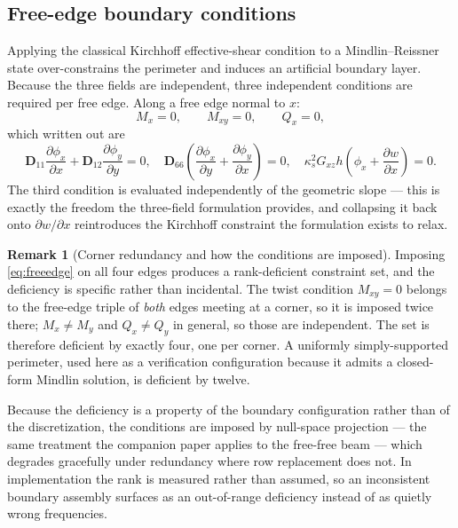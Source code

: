 \documentclass[11pt,a4paper]{article}
\theoremstyle{definition}
\newtheorem{remark}[theorem]{Remark}
\numberwithin{equation}{section}
\begin{document}
\subsection{Free-edge boundary conditions}
\label{sec:bc}

Applying the classical Kirchhoff effective-shear condition to a Mindlin--Reissner state over-constrains the perimeter and induces an artificial boundary layer. Because the three fields are independent, three independent conditions are required per free edge. Along a free edge normal to $x$:
\begin{equation}
\label{eq:freeedge}
M_x = 0, \qquad M_{xy} = 0, \qquad Q_x = 0,
\end{equation}
which written out are
\begin{equation}
\label{eq:freeedge_exp}
\mathbf{D}_{11} \frac{\partial \phi_x}{\partial x} + \mathbf{D}_{12} \frac{\partial \phi_y}{\partial y} = 0,
\quad
\mathbf{D}_{66}\left( \frac{\partial \phi_x}{\partial y} + \frac{\partial \phi_y}{\partial x} \right) = 0,
\quad
\kappa_s^2 G_{xz} h \left( \phi_x + \frac{\partial w}{\partial x} \right) = 0 .
\end{equation}
The third condition is evaluated independently of the geometric slope --- this is exactly the freedom the three-field formulation provides, and collapsing it back onto $\partial w/\partial x$ reintroduces the Kirchhoff constraint the formulation exists to relax.

\begin{remark}[Corner redundancy and how the conditions are imposed]
\label{rem:corner}
Imposing \cref{eq:freeedge} on all four edges produces a rank-deficient constraint set, and the deficiency is specific rather than incidental. The twist condition $M_{xy}=0$ belongs to the free-edge triple of \emph{both} edges meeting at a corner, so it is imposed twice there; $M_x \ne M_y$ and $Q_x \ne Q_y$ in general, so those are independent. The set is therefore deficient by exactly four, one per corner. A uniformly simply-supported perimeter, used here as a verification configuration because it admits a closed-form Mindlin solution, is deficient by twelve.

Because the deficiency is a property of the boundary configuration rather than of the discretization, the conditions are imposed by null-space projection --- the same treatment the companion paper applies to the free-free beam \cite{knox2026passes} --- which degrades gracefully under redundancy where row replacement does not. In implementation the rank is measured rather than assumed, so an inconsistent boundary assembly surfaces as an out-of-range deficiency instead of as quietly wrong frequencies.
\end{remark}
\end{document}
